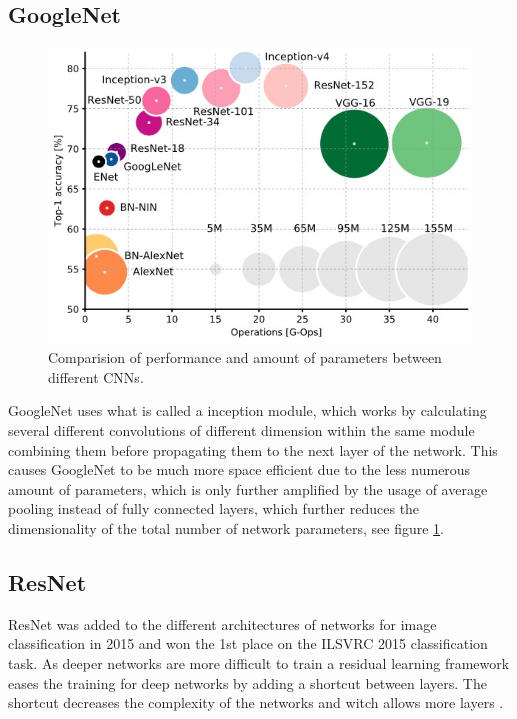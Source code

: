 \documentclass{kthreport}
\begin{document}
\subsection{GoogleNet}
\begin{figure}
  \includegraphics[width=\linewidth]{../images/graph_cnns.jpg}
  \caption[]
  {\small Comparision of performance and amount of parameters between different CNNs.}
  \label{wrap-fig:graph_cnns}
\end{figure}
GoogleNet uses what is called a inception module, which works by calculating several different convolutions of different dimension within the same module combining them before propagating them to the next layer of the network\cite{szegedy2016rethinking}. This causes GoogleNet to be much more space efficient due to the less numerous amount of parameters, which is only further amplified by the usage of average pooling instead of fully connected layers, which further reduces the dimensionality of the total number of network parameters, see figure \ref{wrap-fig:graph_cnns}.

\subsection{ResNet}
ResNet was added to the different architectures of networks for image classification in 2015 and won the 1st place on the ILSVRC 2015 classification task. As deeper networks are more difficult to train a residual learning framework eases the training for deep networks by adding a shortcut between layers. The shortcut decreases the complexity of the networks and witch allows more layers \cite{HeZRS15}.
\end{document}

